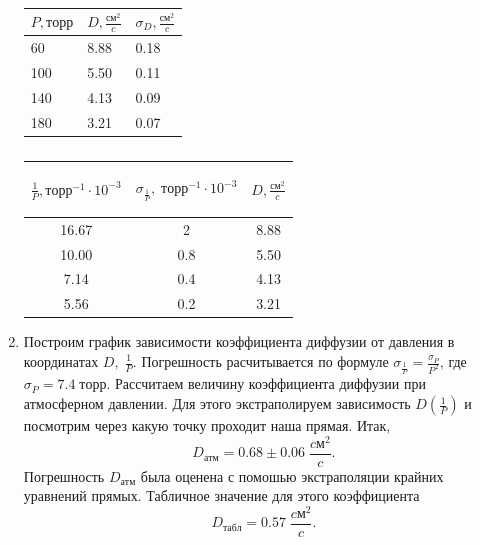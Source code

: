 \documentclass[a4paper,12pt]{article}
\begin{document}
\begin{enumerate}
 \begin{table}[!htb]
 	\centering
 	\begin{minipage}{0.45\linewidth}
 		\centering
 	\caption{}
 	\begin{tabular}{|l|l|l|}
 		\hline
 		\label{tb1}	
 		$P, торр$ & $D, \frac{см^2}{c}$ & $\sigma_D, \frac{см^2}{c}$ \\ \hline
 		60 &  8.88& 0.18 \\ 
 		\hline
 		100 & 5.50  & 0.11 \\ 
 		\hline
 		140 & 4.13 & 0.09 \\ 
 		\hline
 		180& 3.21 & 0.07 \\ 
 		\hline
 	\end{tabular}
\end{minipage}
\begin{minipage}{0.45\linewidth}
	\centering
	\caption{}
	\begin{tabular}{|c|c|c|}
		\hline
		\label{tb1}
		
		$\frac{1}{P} , торр^{-1}\cdot 10^{-3} $ & $\sigma_{\frac{1}{P}} ,\;торр^{-1}\cdot 10^{-3}$ & $D, \frac{см^2}{c} $\\ \hline
		16.67 & 2 & 8.88\\ 
		\hline
		10.00 & 0.8 &5.50 \\ 
		\hline
		7.14 & 0.4 &4.13 \\ 
		\hline
		5.56& 0.2 &3.21 \\ 
		\hline
	
	\end{tabular}
\end{minipage}
\end{table}

\item Построим график зависимости коэффициента диффузии от давления в координатах $D, \; \frac{1}{P}.$ Погрешность расчитывается по формуле $\sigma{_\frac{1}{P}} = \frac{\sigma_P}{P^2}$, где $\sigma_P = 7.4 \; {торр}$. Рассчитаем величину коэффициента диффузии при атмосферном давлении. Для этого экстраполируем зависимость $D(\frac{1}{P})$ и посмотрим через какую точку проходит наша прямая. Итак, $$D_{атм} =0.68 \pm 0.06  \; \frac{cм^2}{c}.$$ Погрешность $D_{атм}$ была оценена с помошью экстраполяции крайних уравнений прямых. Табличное значение для этого коэффициента $$D_{табл} = 0.57\;\frac{cм^2}{c}.$$



\end{enumerate}
\end{document}
